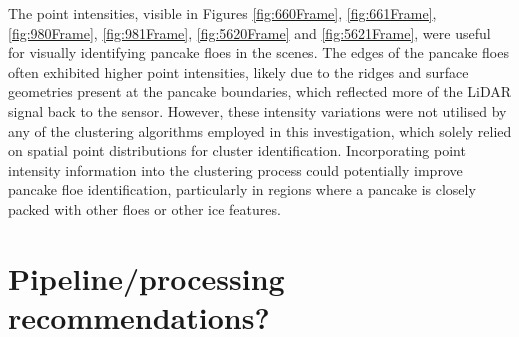 The point intensities, visible in Figures \ref{fig:660Frame}, \ref{fig:661Frame}, \ref{fig:980Frame}, \ref{fig:981Frame}, \ref{fig:5620Frame} and \ref{fig:5621Frame}, were useful for visually identifying pancake floes in the scenes. The edges of the pancake floes often exhibited higher point intensities, likely due to the ridges and surface geometries present at the pancake boundaries, which reflected more of the \ac{LiDAR} signal back to the sensor. However, these intensity variations were not utilised by any of the clustering algorithms employed in this investigation, which solely relied on spatial point distributions for cluster identification. Incorporating point intensity information into the clustering process could potentially improve pancake floe identification, particularly in regions where a pancake is closely packed with other floes or other ice features.

\section{Pipeline/processing recommendations?}
\label{sec:ch8.section5}

